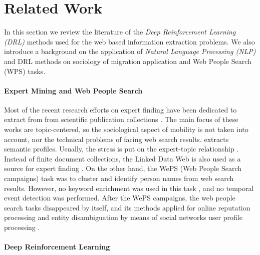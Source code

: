 \documentclass[11pt,a4paper]{article}
\newcommand{\PA}[1]{{\textcolor{blue}{#1}}}
\begin{document}

\section{Related Work}\label{related}
In this section we review the literature of the \textit{Deep Reinforcement Learning (DRL)} methods used for the web based information extraction problems. We also introduce a background on the application of \textit{Natural Language Processing (NLP)} and DRL methods on sociology of migration application and Web People Search (WPS) tasks. 

\paragraph{Expert Mining and Web People Search}
Most of the recent research efforts on expert finding have been dedicated to extract from from scientific publication collections \cite{Bordea2014, Bordea2013, Bordea2012}. The main focus of these works are topic-centered, so the sociological aspect of mobility is not taken into account, nor the technical problems of facing web search results.  
\cite{Loffler2017} extracts semantic profiles. Usually, the stress is put on the expert-topic relationship \cite{Jonnalagadda2014, Bei2017}. Instead of finite document collections, the Linked Data Web is also used as a source for expert finding \cite{Stankovic2011}. On the other hand, the WePS (Web People Search campaigns)\cite{Amigo2010, Artiles2008} task was to cluster and identify person names from web search results. However, no keyword enrichment was used in this task \cite{Artiles2009}, and no temporal event detection was performed. After the WePS campaigns, the web people search tasks disappeared by itself, and its methods applied for online reputation processing \cite{Shad2016} and entity disambiguation by means of social networks user profile processing \cite{Amigo2013, Yerva2013}. 

\paragraph{Deep Reinforcement Learning}

\end{document}
